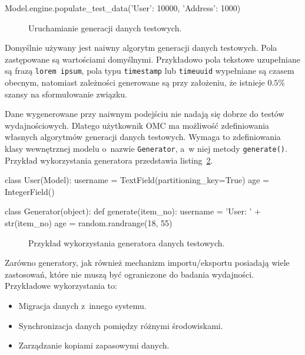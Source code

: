 \begin{verbbox}
	Model.engine.populate_test_data({'User': 10000, 'Address': 1000})
\end{verbbox}

\begin{figure}[ht!]
	\centering
	\theverbbox
	\caption{Uruchamianie generacji danych testowych.}
	\label{vrb:test_data_populatiuon}
\end{figure}

Domyślnie używany jest naiwny algorytm generacji danych testowych. Pola zastępowane są wartościami domyślnymi. Przykładowo pola tekstowe uzupełniane są frazą \verb+lorem ipsum+, pola typu \verb+timestamp+ lub \verb+timeuuid+ wypełniane są czasem obecnym, natomiast zależności generowane są przy założeniu, że istnieje $0.5\%$ szansy na sformułowanie związku. 

Dane wygenerowane przy naiwnym podejściu nie nadają się dobrze do testów wydajnościowych. Dlatego użytkownik OMC ma możliwość zdefiniowania własnych algorytmów generacji danych testowych. Wymaga to zdefiniowania klasy wewnętrznej modelu o~nazwie \verb+Generator+, a~w niej metody \verb+generate()+. Przykład wykorzystania generatora przedstawia listing~\ref{vrb:test_data_generator}.

\begin{verbbox}
	class User(Model):
	    username = TextField(partitioning_key=True)
	    age = IntegerField()

	    class Generator(object):
	        def generate(item_no):
	            username = 'User: ' + str(item_no)
	            age = random.randrange(18, 55)
\end{verbbox}

\begin{figure}[ht!]
	\centering
	\theverbbox
	\caption{Przykład wykorzystania generatora danych testowych.}
	\label{vrb:test_data_generator}
\end{figure}

Zarówno generatory, jak również mechanizm importu/eksportu posiadają wiele zastosowań, które nie muszą być ograniczone do badania wydajności. Przykładowe wykorzystania to:

\begin{itemize}
	\item Migracja danych z~innego systemu.
	\item Synchronizacja danych pomiędzy różnymi środowiskami.
	\item Zarządzanie kopiami zapasowymi danych.
\end{itemize}

